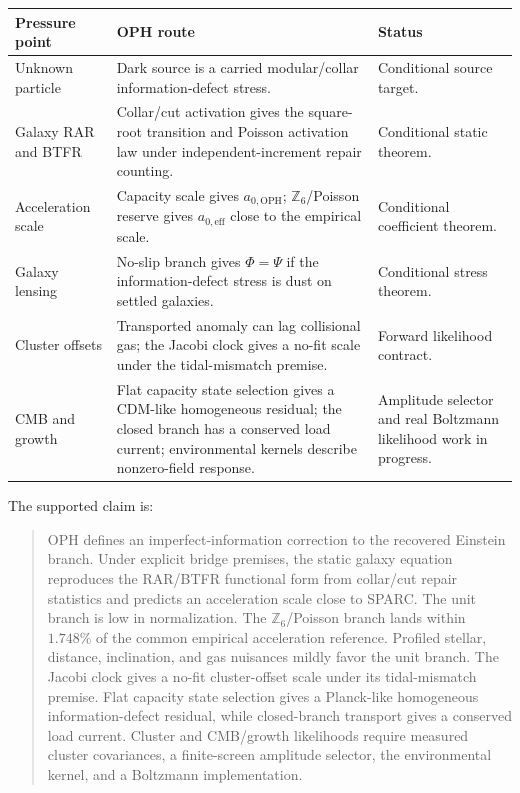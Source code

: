\documentclass[11pt]{article}
\newcommand{\aoph}{a_{0,\mathrm{OPH}}}
\newcommand{\aeff}{a_{0,\mathrm{eff}}}
\newcommand{\Zsix}{\mathbb Z_6}
\begin{document}
\begin{longtable}{@{}p{}p{}p{}@{}}
\toprule
Pressure point & OPH route & Status \\
\midrule
\endhead
Unknown particle & Dark source is a carried modular/collar information-defect
stress. & Conditional source target. \\
Galaxy RAR and BTFR & Collar/cut activation gives the square-root transition
and Poisson activation law under independent-increment repair counting. &
Conditional static theorem. \\
Acceleration scale & Capacity scale gives \(\aoph\); \(\Zsix\)/Poisson reserve
gives \(\aeff\) close to the empirical scale. & Conditional coefficient
theorem. \\
Galaxy lensing & No-slip branch gives \(\Phi=\Psi\) if the information-defect
stress is dust on settled galaxies. & Conditional stress theorem. \\
Cluster offsets & Transported anomaly can lag collisional gas; the Jacobi
clock gives a no-fit scale under the tidal-mismatch premise. & Forward
likelihood contract. \\
CMB and growth & Flat capacity state selection gives a CDM-like homogeneous
residual; the closed branch has a conserved load current; environmental
kernels describe nonzero-field response. & Amplitude selector and real
Boltzmann likelihood work in progress. \\
\bottomrule
\end{longtable}

The supported claim is:
\begin{quote}
OPH defines an imperfect-information correction to the recovered Einstein
branch.  Under explicit bridge premises, the static galaxy equation reproduces
the RAR/BTFR functional form from collar/cut repair statistics and predicts an
acceleration scale close to SPARC.  The unit branch is low in normalization.
The \(\Zsix\)/Poisson branch lands within \(1.748\%\) of the common empirical
acceleration reference.  Profiled stellar, distance, inclination, and gas
nuisances mildly favor the unit branch.  The Jacobi clock gives a no-fit
cluster-offset scale under its tidal-mismatch premise.  Flat capacity state
selection gives a Planck-like homogeneous information-defect residual, while
closed-branch transport gives a conserved load current.  Cluster and
CMB/growth likelihoods require measured cluster covariances, a finite-screen
amplitude selector, the environmental kernel, and a Boltzmann implementation.
\end{quote}
\end{document}
